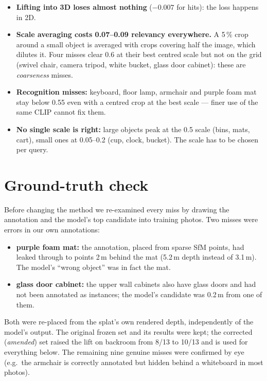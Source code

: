 \documentclass[11pt,a4paper]{article}
\begin{document}
\begin{itemize}
  \item \textbf{Lifting into 3D loses almost nothing} ($-0.007$ for hits): the loss happens in 2D.
  \item \textbf{Scale averaging costs 0.07--0.09 relevancy everywhere.} A 5\,\% crop around a small object is
        averaged with crops covering half the image, which dilutes it. Four misses clear 0.6 at their best
        centred scale but not on the grid (swivel chair, camera tripod, white bucket, glass door cabinet): these
        are \emph{coarseness} misses.
  \item \textbf{Recognition misses:} keyboard, floor lamp, armchair and purple foam mat stay below 0.55 even with a
        centred crop at the best scale --- finer use of the same CLIP cannot fix them.
  \item \textbf{No single scale is right:} large objects peak at the 0.5 scale (bins, mats, cart), small ones at
        0.05--0.2 (cup, clock, bucket). The scale has to be chosen per query.
\end{itemize}

\section{Ground-truth check}

Before changing the method we re-examined every miss by drawing the annotation and the model's top candidate
into training photos. Two misses were errors in our own annotations:
\begin{itemize}
  \item \textbf{purple foam mat:} the annotation, placed from sparse SfM points, had leaked through to points 2\,m
        behind the mat (5.2\,m depth instead of 3.1\,m). The model's ``wrong object'' was in fact the mat.
  \item \textbf{glass door cabinet:} the upper wall cabinets also have glass doors and had not been annotated as
        instances; the model's candidate was 0.2\,m from one of them.
\end{itemize}
Both were re-placed from the splat's own rendered depth, independently of the model's output. The original
frozen set and its results were kept; the corrected (\emph{amended}) set raised the lift on backroom from 8/13 to
10/13 and is used for everything below. The remaining nine genuine misses were confirmed by eye (e.g.\ the
armchair is correctly annotated but hidden behind a whiteboard in most photos).
\end{document}
